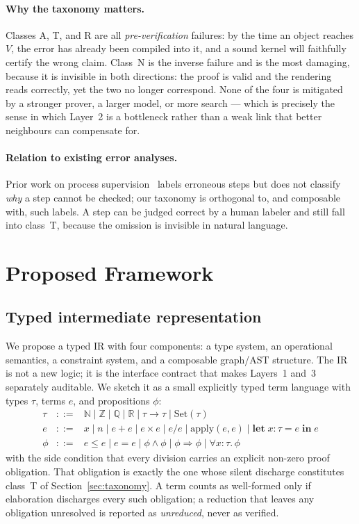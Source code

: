 \documentclass[11pt,a4paper]{article}
\begin{document}
\paragraph{Why the taxonomy matters.}
Classes A, T, and R are all \emph{pre-verification} failures: by the time an
object reaches $V$, the error has already been compiled into it, and a sound
kernel will faithfully certify the wrong claim.  Class~N is the inverse failure
and is the most damaging, because it is invisible in both directions: the proof
is valid and the rendering reads correctly, yet the two no longer correspond.
None of the four is mitigated by a stronger prover, a larger model, or more
search --- which is precisely the sense in which Layer~2 is a bottleneck rather
than a weak link that better neighbours can compensate for.

\paragraph{Relation to existing error analyses.}
Prior work on process supervision~\cite{lightman2023lets} labels erroneous steps
but does not classify \emph{why} a step cannot be checked; our taxonomy is
orthogonal to, and composable with, such labels.  A step can be judged correct
by a human labeler and still fall into class~T, because the omission is
invisible in natural language.

\section{Proposed Framework}
\label{sec:framework}

\subsection{Typed intermediate representation}
We propose a typed IR with four components: a type system, an operational
semantics, a constraint system, and a composable graph/AST structure.  The IR is
not a new logic; it is the interface contract that makes Layers~1 and~3
separately auditable.  We sketch it as a small explicitly typed term language
with types $\tau$, terms $e$, and propositions $\phi$:
\[
\begin{array}{rcl}
\tau & ::= & \mathbb{N} \mid \mathbb{Z} \mid \mathbb{Q} \mid \mathbb{R}
            \mid \tau \to \tau \mid \mathrm{Set}(\tau) \\[2pt]
e & ::= & x \mid n \mid e + e \mid e \times e \mid e/e
          \mid \mathrm{apply}(e,e) \mid \mathbf{let}\;x:\tau = e\;\mathbf{in}\;e \\[2pt]
\phi & ::= & e \le e \mid e = e \mid \phi \land \phi \mid \phi \Rightarrow \phi
            \mid \forall x{:}\tau.\,\phi
\end{array}
\]
with the side condition that every division carries an explicit non-zero proof
obligation.  That obligation is exactly the one whose silent discharge
constitutes class~T of Section~\ref{sec:taxonomy}.  A term counts as
well-formed only if elaboration discharges every such obligation; a reduction
that leaves any obligation unresolved is reported as \emph{unreduced}, never as
verified.
\end{document}
